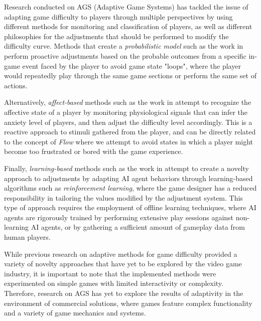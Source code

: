 Research conducted on AGS (Adaptive Game Systems) has tackled the issue of adapting game difficulty to players through multiple perspectives by using different methods for monitoring and classification of players, as well as different philosophies for the adjustments that should be performed to modify the difficulty curve. Methods that create a \emph{probabilistic model} such as the work in \cite{article_casefordda} perform proactive adjustments based on the probable outcomes from a specific in-game event faced by the player to avoid game state "loops", where the player would repeatedly play through the same game sections or perform the same set of actions.

Alternatively, \emph{affect-based} methods such as the work in \cite{article_affectivedda} attempt to recognize the affective state of a player by monitoring physiological signals that can infer the anxiety level of players, and then adjust the difficulty level accordingly. This is a reactive approach to stimuli gathered from the player, and can be directly related to the concept of \emph{Flow} where we attempt to avoid states in which a player might become too frustrated or bored with the game experience.

Finally, \emph{learning-based} methods such as the work in \cite{article_adaptivebehaviorai} attempt to create a novelty approach to adjustments by adapting AI agent behaviors through learning-based algorithms such as \emph{reinforcement learning}, where the game designer has a reduced responsibility in tailoring the values modified by the adjustment system. This type of approach requires the employment of offline learning techniques, where AI agents are rigorously trained by performing extensive play sessions against non-learning AI agents, or by gathering a sufficient amount of gameplay data from human players.


While previous research on adaptive methods for game difficulty provided a variety of novelty approaches that have yet to be explored by the video game industry, it is important to note that the implemented methods were experimented on simple games with limited interactivity or complexity. Therefore, research on AGS has yet to explore the results of adaptivity in the environment of commercial solutions, where games feature complex functionality and a variety of game mechanics and systems.

